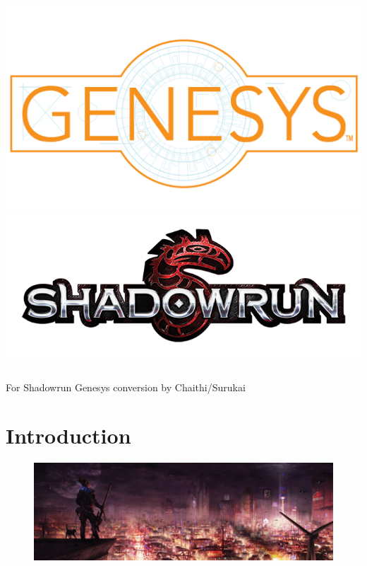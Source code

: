 \documentclass{book}
\begin{document}
\begin{center}
	\includegraphics[width=0.7\linewidth]{images/GenesysLogo}
	\includegraphics[width=0.5\linewidth]{"images/SR5 Logo Full"}
\end{center}

\section*{}

\begin{center}
	\large For Shadowrun Genesys conversion by Chaithi/Surukai
\end{center}

\chapter{Introduction}
\begin{figure}[h]
	\centering
	\includegraphics[width=0.9\linewidth]{"images/SR5_City_Berlin"}
	\label{fig:sr5gun-battle}
\end{figure}
\end{document}
